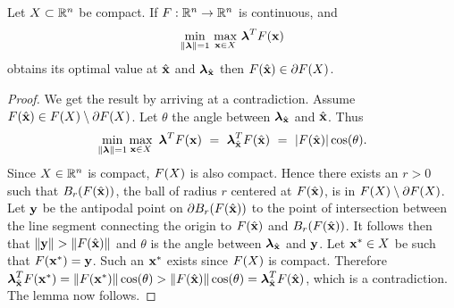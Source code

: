 \begin{lem} 
\label{lem:BdOpt}
Let $X\subset\mathbb{R}^n$ be compact. If $F:\mathbb{R}^n\rightarrow\mathbb{R}^n$ is continuous, and 
\[
\min\limits_{\lVert\boldsymbol{\lambda}\rVert=1} \, \max\limits_{\mathbf{x}\in X} \, \boldsymbol{\lambda}^TF(\mathbf{x})
\]
obtains its optimal value at $\hat{\mathbf{x}}$ and $\boldsymbol{\lambda}_{\hat{\mathbf{x}}}$ then $F(\hat{\mathbf{x}})\in \partial F(X)$. 


\begin{proof} 
  We get the result by arriving at a contradiction.
  Assume $F(\hat{\mathbf{x}})\in F(X)\setminus\partial F(X)$. 
  Let $\theta$ the angle between $\boldsymbol{\lambda}_{\hat{\mathbf{x}}}$ and $\hat{\mathbf{x}}$. 
  Thus
  \[
  \min\limits_{\lVert\boldsymbol{\lambda}\rVert=1}\max\limits_{\mathbf{x}\in X}\ \boldsymbol{\lambda}^TF(\mathbf{x}) ~=~ \boldsymbol{\lambda}_{\hat{\mathbf{x}}}^TF(\hat{\mathbf{x}}) ~=~ |F(\hat{\mathbf{x}})|\cos(\theta).
  \]
  Since $X\in\mathbb{R}^n$ is compact, $F(X)$ is also compact. 
  Hence there exists an $r>0$ such that  $B_r(F(\hat{\mathbf{x}}))$, the ball of radius $r$ centered at $F(\hat{\mathbf{x}})$, is in $F(X)\setminus\partial F(X)$. 
  Let $\mathbf{y}$ be the antipodal point on $\partial B_r(F(\hat{\mathbf{x}}))$ to the point of intersection between the line segment connecting the origin to $F(\hat{\mathbf{x}})$ and $B_r(F(\hat{\mathbf{x}}))$. 
  It follows then that $\lVert\mathbf{y}\rVert>\lVert F(\hat{\mathbf{x}})\rVert$ and $\theta$ is the angle between $\boldsymbol{\lambda}_{\hat{\mathbf{x}}}$ and $\mathbf{y}$.   
  Let $\mathbf{x}^*\in X$ be such that $F(\mathbf{x}^*)=\mathbf{y}$.
  Such an $\mathbf{x}^*$ exists since $F(X)$ is compact. 
  Therefore $\boldsymbol{\lambda}_{\hat{\mathbf{x}}}^TF(\mathbf{x}^*)=\lVert F(\mathbf{x}^*)\rVert \cos(\theta) > \lVert F(\hat{\mathbf{x}})\rVert \cos(\theta) = \boldsymbol{\lambda}_{\hat{\mathbf{x}}}^TF(\hat{\mathbf{x}})$, which is a contradiction. 
  The lemma now follows.
\end{proof}
\end{lem}


